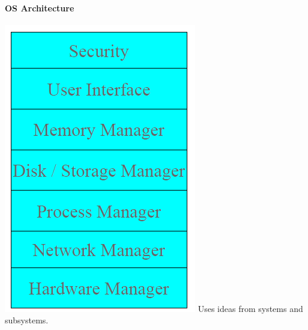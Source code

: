 \documentclass[12 pt]{article}
\begin{document}
	\paragraph{OS Architecture}
	\includegraphics[scale=0.5]{oss} Uses ideas from systems and subsystems.
\end{document}
